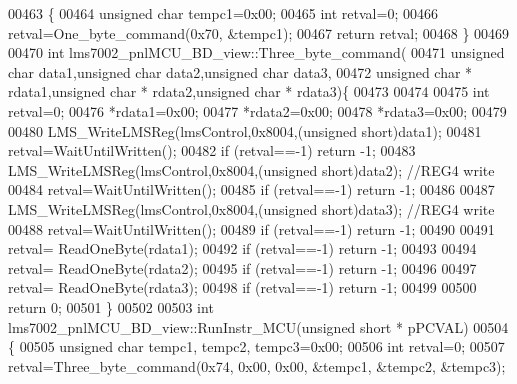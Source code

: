 \begin{DoxyCode}
{{{{{{{00463 \{
00464     \textcolor{keywordtype}{unsigned} \textcolor{keywordtype}{char} tempc1=0x00;
00465     \textcolor{keywordtype}{int} retval=0;
00466     retval=One_byte_command(0x70, &tempc1);
00467     \textcolor{keywordflow}{return} retval;
00468 \}
00469 
00470 \textcolor{keywordtype}{int} lms7002_pnlMCU_BD_view::Three_byte_command(
00471         \textcolor{keywordtype}{unsigned} \textcolor{keywordtype}{char} data1,\textcolor{keywordtype}{unsigned} \textcolor{keywordtype}{char} data2,\textcolor{keywordtype}{unsigned} \textcolor{keywordtype}{char} data3,
00472         \textcolor{keywordtype}{unsigned} \textcolor{keywordtype}{char} * rdata1,\textcolor{keywordtype}{unsigned} \textcolor{keywordtype}{char} * rdata2,\textcolor{keywordtype}{unsigned} \textcolor{keywordtype}{char} * rdata3)\{
00473 
00474 
00475     \textcolor{keywordtype}{int} retval=0;
00476     *rdata1=0x00;
00477     *rdata2=0x00;
00478     *rdata3=0x00;
00479 
00480     LMS_WriteLMSReg(lmsControl,0x8004,(\textcolor{keywordtype}{unsigned} \textcolor{keywordtype}{short})data1);
00481     retval=WaitUntilWritten();
00482     \textcolor{keywordflow}{if} (retval==-1) \textcolor{keywordflow}{return} -1;
00483     LMS_WriteLMSReg(lmsControl,0x8004,(\textcolor{keywordtype}{unsigned} \textcolor{keywordtype}{short})data2); \textcolor{comment}{//REG4 write}
00484     retval=WaitUntilWritten();
00485     \textcolor{keywordflow}{if} (retval==-1) \textcolor{keywordflow}{return} -1;
00486 
00487     LMS_WriteLMSReg(lmsControl,0x8004,(\textcolor{keywordtype}{unsigned} \textcolor{keywordtype}{short})data3); \textcolor{comment}{//REG4 write}
00488     retval=WaitUntilWritten();
00489     \textcolor{keywordflow}{if} (retval==-1) \textcolor{keywordflow}{return} -1;
00490 
00491     retval= ReadOneByte(rdata1);
00492     \textcolor{keywordflow}{if} (retval==-1) \textcolor{keywordflow}{return} -1;
00493 
00494     retval= ReadOneByte(rdata2);
00495     \textcolor{keywordflow}{if} (retval==-1) \textcolor{keywordflow}{return} -1;
00496 
00497     retval= ReadOneByte(rdata3);
00498     \textcolor{keywordflow}{if} (retval==-1) \textcolor{keywordflow}{return} -1;
00499 
00500     \textcolor{keywordflow}{return} 0;
00501 \}
00502 
00503 \textcolor{keywordtype}{int} lms7002_pnlMCU_BD_view::RunInstr_MCU(\textcolor{keywordtype}{unsigned} \textcolor{keywordtype}{short} * pPCVAL)
00504 \{
00505     \textcolor{keywordtype}{unsigned} \textcolor{keywordtype}{char} tempc1, tempc2, tempc3=0x00;
00506     \textcolor{keywordtype}{int} retval=0;
00507     retval=Three_byte_command(0x74, 0x00, 0x00, &tempc1, &tempc2, &tempc3);
}}}}}}}
\end{DoxyCode}
